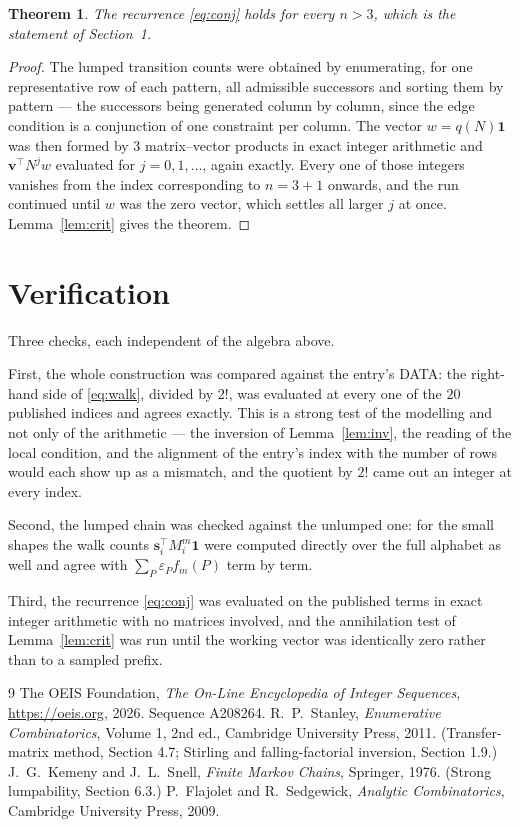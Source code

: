 \documentclass[11pt,a4paper]{article}
\theoremstyle{plain}
\newtheorem{theorem}{Theorem}
\theoremstyle{definition}
\begin{document}
\begin{theorem}
The recurrence \eqref{eq:conj} holds for every $n>3$, which is the statement of
Section~1.
\end{theorem}

\begin{proof}
The lumped transition counts were obtained by enumerating, for one representative row of
each pattern, all admissible successors and sorting them by pattern --- the successors being
generated column by column, since the edge condition is a conjunction of one constraint per
column. The vector $w=q(N)\mathbf{1}$ was then formed by $3$ matrix--vector products
in exact integer arithmetic and $\mathbf{v}^{\!\top}N^{j}w$ evaluated for
$j=0,1,\dots$, again exactly. Every one of those integers vanishes from the index
corresponding to $n=3+1$ onwards, and the run continued until $w$ was the zero vector,
which settles all larger $j$ at once. Lemma~\ref{lem:crit} gives the theorem.
\end{proof}

\section{Verification}

Three checks, each independent of the algebra above.

First, the whole construction was compared against the entry's DATA: the right-hand side of
\eqref{eq:walk}, divided by $2!$, was evaluated at every one of the $20$
published indices and agrees exactly. This is a strong test of the modelling and not only of
the arithmetic --- the inversion of Lemma~\ref{lem:inv}, the reading of the local
condition, and the alignment of the entry's index with the number of rows would each
show up as a mismatch, and the quotient by $2!$ came out an integer at every index.

Second, the lumped chain was checked against the unlumped one: for the small shapes the walk
counts $\mathbf{s}_i^{\!\top}M_i^{m}\mathbf{1}$ were computed directly over the full
alphabet as well and agree with $\sum_P\varepsilon_Pf_m(P)$ term by term.

Third, the recurrence \eqref{eq:conj} was evaluated on the published terms in exact integer
arithmetic with no matrices involved, and the annihilation test of Lemma~\ref{lem:crit} was
run until the working vector was identically zero rather than to a sampled prefix.

\begin{thebibliography}{9}
 The OEIS Foundation, \emph{The On-Line Encyclopedia of Integer
Sequences}, \url{https://oeis.org}, 2026. Sequence A208264.
 R.~P.~Stanley, \emph{Enumerative Combinatorics}, Volume 1, 2nd ed.,
Cambridge University Press, 2011. (Transfer-matrix method, Section 4.7; Stirling and
falling-factorial inversion, Section 1.9.)
 J.~G.~Kemeny and J.~L.~Snell, \emph{Finite Markov Chains}, Springer,
1976. (Strong lumpability, Section 6.3.)
 P.~Flajolet and R.~Sedgewick, \emph{Analytic Combinatorics}, Cambridge
University Press, 2009.
\end{thebibliography}
\end{document}
